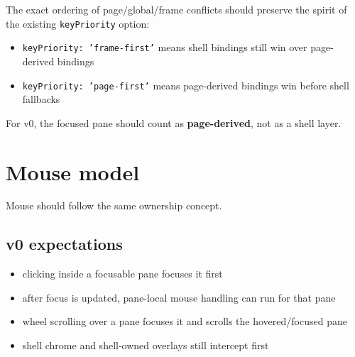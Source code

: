The exact ordering of page/global/frame conflicts should preserve the spirit of the existing \texttt{k\allowbreak{}e\allowbreak{}y\allowbreak{}P\allowbreak{}r\allowbreak{}i\allowbreak{}o\allowbreak{}r\allowbreak{}i\allowbreak{}t\allowbreak{}y} option:

\begin{itemize}
\tightlist
\item
  \texttt{k\allowbreak{}e\allowbreak{}y\allowbreak{}P\allowbreak{}r\allowbreak{}i\allowbreak{}o\allowbreak{}r\allowbreak{}i\allowbreak{}t\allowbreak{}y\allowbreak{}:\allowbreak{} \allowbreak{}'\allowbreak{}f\allowbreak{}r\allowbreak{}a\allowbreak{}m\allowbreak{}e\allowbreak{}-\allowbreak{}f\allowbreak{}i\allowbreak{}r\allowbreak{}s\allowbreak{}t\allowbreak{}'} means shell bindings still win over page-derived bindings
\item
  \texttt{k\allowbreak{}e\allowbreak{}y\allowbreak{}P\allowbreak{}r\allowbreak{}i\allowbreak{}o\allowbreak{}r\allowbreak{}i\allowbreak{}t\allowbreak{}y\allowbreak{}:\allowbreak{} \allowbreak{}'\allowbreak{}p\allowbreak{}a\allowbreak{}g\allowbreak{}e\allowbreak{}-\allowbreak{}f\allowbreak{}i\allowbreak{}r\allowbreak{}s\allowbreak{}t\allowbreak{}'} means page-derived bindings win before shell fallbacks
\end{itemize}

For v0, the focused pane should count as \textbf{page-derived}, not as a shell layer.

\section{Mouse model}\label{record-044-mouse-model}

Mouse should follow the same ownership concept.

\subsection{v0 expectations}\label{record-044-v0-expectations}

\begin{itemize}
\tightlist
\item
  clicking inside a focusable pane focuses it first
\item
  after focus is updated, pane-local mouse handling can run for that pane
\item
  wheel scrolling over a pane focuses it and scrolls the hovered/focused pane
\item
  shell chrome and shell-owned overlays still intercept first
\end{itemize}


